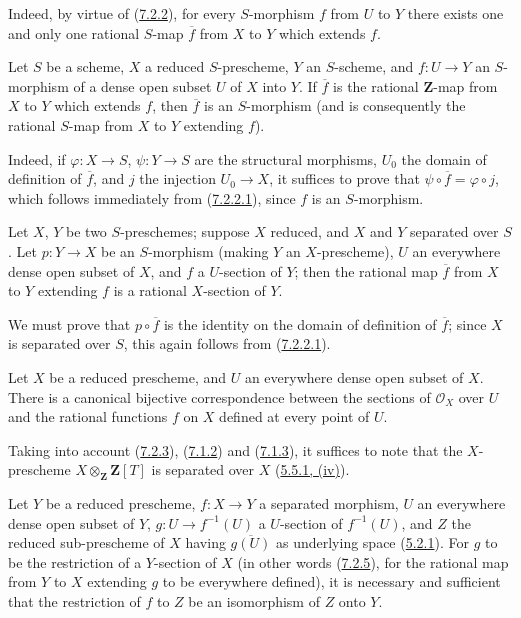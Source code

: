 Indeed, by virtue of (\hyperref[I.7.2.2]{7.2.2}), for every $S$-morphism
$f$ from $U$ to $Y$ there exists one and only one rational $S$-map
$\overline f$ from $X$ to $Y$ which extends $f$.

\begin{corollary}[7.2.4]
\label{I.7.2.4}
Let $S$ be a scheme, $X$ a reduced $S$-prescheme, $Y$ an $S$-scheme, and
$f:U\to Y$ an $S$-morphism of a dense open subset $U$ of $X$ into $Y$. If
$\overline f$ is the rational $\mathbf{Z}$-map from $X$ to $Y$ which
extends $f$, then $\overline f$ is an $S$-morphism (and is consequently the
rational $S$-map from $X$ to $Y$ extending $f$).
\end{corollary}

Indeed, if $\varphi:X\to S$, $\psi:Y\to S$ are the structural morphisms,
$U_0$ the domain of definition of $\overline f$, and $j$ the injection
$U_0\to X$, it suffices to prove that $\psi\circ\overline f=\varphi\circ j$,
which follows immediately from (\hyperref[I.7.2.2.1]{7.2.2.1}), since $f$
is an $S$-morphism.

\begin{corollary}[7.2.5]
\label{I.7.2.5}
Let $X$, $Y$ be two $S$-preschemes; suppose $X$ reduced, and $X$ and $Y$
separated over $S$. Let $p:Y\to X$ be an $S$-morphism (making $Y$ an
$X$-prescheme), $U$ an everywhere dense open subset of $X$, and $f$ a
$U$-section of $Y$; then the rational map $\overline f$ from $X$ to $Y$
extending $f$ is a rational $X$-section of $Y$.
\end{corollary}

We must prove that $p\circ\overline f$ is the identity on the domain of
definition of $\overline f$; since $X$ is separated over $S$, this again
follows from (\hyperref[I.7.2.2.1]{7.2.2.1}).

\begin{corollary}[7.2.6]
\label{I.7.2.6}
Let $X$ be a reduced prescheme, and $U$ an everywhere dense open subset of
$X$. There is a canonical bijective correspondence between the sections of
$\mathscr{O}_X$ over $U$ and the rational functions $f$ on $X$ defined at
every point of $U$.
\end{corollary}

Taking into account (\hyperref[I.7.2.3]{7.2.3}),
(\hyperref[I.7.1.2]{7.1.2}) and (\hyperref[I.7.1.3]{7.1.3}), it
suffices to note that the $X$-prescheme $X\otimes_{\mathbf Z}\mathbf Z[T]$ is
separated over $X$ (\hyperref[I.5.5.1]{5.5.1, (iv)}).

\begin{corollary}[7.2.7]
\label{I.7.2.7}
Let $Y$ be a reduced prescheme, $f:X\to Y$ a separated morphism, $U$ an
everywhere dense open subset of $Y$, $g:U\to f^{-1}(U)$ a $U$-section of
$f^{-1}(U)$, and $Z$ the reduced sub-prescheme of $X$ having
$\overline{g(U)}$ as underlying space
\textup{(\hyperref[I.5.2.1]{5.2.1})}. For $g$ to be the restriction of a
$Y$-section of $X$ \textup{(in other words \textup{(\hyperref[I.7.2.5]{7.2.5})}, for the
rational map from $Y$ to $X$ extending $g$ to be everywhere defined)}, it is
necessary and sufficient that the restriction of $f$ to $Z$ be an
isomorphism of $Z$ onto $Y$.
\end{corollary}

